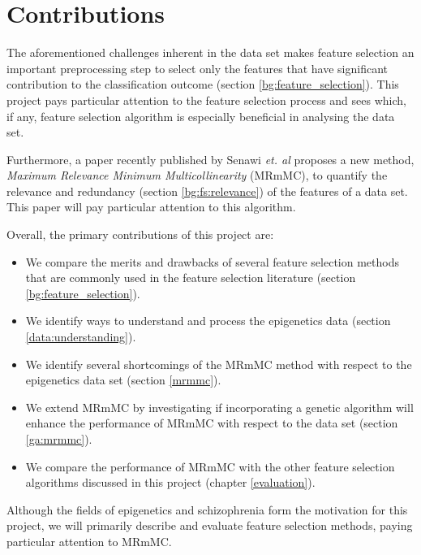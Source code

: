\documentclass[12pt, twoside, a4paper]{report}
\begin{document}



\section{Contributions}
The aforementioned challenges inherent in the data set makes feature selection an important preprocessing step to select only the features that have significant contribution to the classification outcome (section \ref{bg:feature_selection}). This project pays particular attention to the feature selection process and sees which, if any, feature selection algorithm is especially beneficial in analysing the data set.

Furthermore, a paper recently published by Senawi \textit{et. al} \cite{RefWorks:187} proposes a new method, \textit{Maximum Relevance Minimum Multicollinearity} (MRmMC), to quantify the relevance and redundancy (section \ref{bg:fs:relevance}) of the features of a data set. This paper will pay particular attention to this algorithm.

Overall, the primary contributions of this project are:
\begin{itemize}
  \item We compare the merits and drawbacks of several feature selection methods that are commonly used in the feature selection literature (section \ref{bg:feature_selection}).
  \item We identify ways to understand and process the epigenetics data (section \ref{data:understanding}).
  \item We identify several shortcomings of the MRmMC method with respect to the epigenetics data set (section \ref{mrmmc}).
  \item We extend MRmMC by investigating if incorporating a genetic algorithm will enhance the performance of MRmMC with respect to the data set (section \ref{ga:mrmmc}).
  \item We compare the performance of MRmMC with the other feature selection algorithms discussed in this project (chapter \ref{evaluation}).
\end{itemize}

Although the fields of epigenetics and schizophrenia form the motivation for this project, we will primarily describe and evaluate feature selection methods, paying particular attention to MRmMC.
\end{document}
